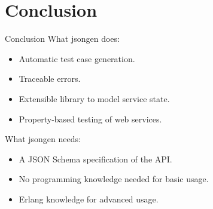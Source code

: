 \section{Conclusion}

\begin{frame}{Conclusion}
  What jsongen does:
\begin{itemize}
\item Automatic test case generation.
\item Traceable errors.
\item Extensible library to model service state.
\item Property-based testing of web services.
\end{itemize}

What jsongen needs:
  \begin{itemize}
    \item A JSON Schema specification of the API.
    \item No programming knowledge needed for basic usage.
    \item Erlang knowledge for advanced usage.
  \end{itemize}
\end{frame}
